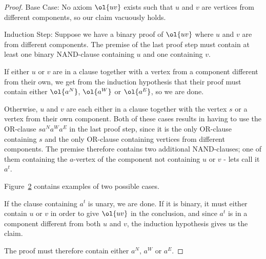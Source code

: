 \begin{proof}
  Base Case:
  No axiom $\ol{uv}$ exists such that $u$ and $v$ are vertices from different components, so our claim vacuously holds.

  Induction Step:
  Suppose we have a binary proof of $\ol{uv}$ where $u$ and $v$ are from different components.
  The premise of the last proof step must contain at least one binary NAND-clause containing $u$ and one containing $v$.\par
  \begin{figure}[!h]
    \centering
    \begin{prooftree*}
      \Hypo{\dots}
    \end{prooftree*}
    \caption{}
    \label{fig:proof_scheme_uv}
  \end{figure}
  If either $u$ or $v$ are in a clause together with a vertex from a component different from their own, we get from the induction hypothesis that their proof must contain either $\ol{a^N}$, $\ol{a^W}$ or $\ol{a^E}$, so we are done.

  Otherwise, $u$ and $v$ are each either in a clause together with the vertex $s$ or a vertex from their own component.
  Both of these cases results in having to use the OR-clause $sa^Na^Wa^E$ in the last proof step, since it is the only OR-clause containing $s$ and the only OR-clause containing vertices from different components.
  The premise therefore contains two additional NAND-clauses; one of them containing the $a$-vertex of the component not containing $u$ or $v$ - lets call it $a^t$.

  Figure~\ref{fig:proof_example_uv} contains examples of two possible cases.\par
  \begin{figure}[!h]
    \centering
    \begin{prooftree}
    \end{prooftree}
    \hspace{5mm}
    \begin{prooftree}
    \end{prooftree}
    \caption{}
    \label{fig:proof_example_uv}
  \end{figure}
  If the clause containing $a^t$ is unary, we are done.
  If it is binary, it must either contain $u$ or $v$ in order to give $\ol{uv}$ in the conclusion, and since $a^t$ is in a component different from both $u$ and $v$, the induction hypothesis gives us the claim.

  The proof must therefore contain either $a^N$, $a^W$ or $a^E$.
\end{proof}

